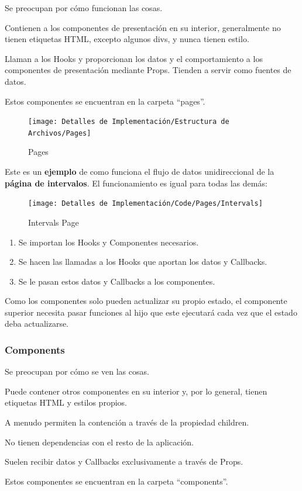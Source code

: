 \documentclass[12pt,twoside,titlepage]{report}
\begin{document}
\begin{compactitem}
    \item Se preocupan por cómo funcionan las cosas.
    \item Contienen a los componentes de presentación en su interior, generalmente no tienen etiquetas HTML, excepto algunos divs, y nunca tienen estilo.
    \item Llaman a los Hooks y proporcionan los datos y el comportamiento a los componentes de presentación mediante Props. Tienden a servir como fuentes de datos.
    \item Estos componentes se encuentran en la carpeta ``pages''.
\end{compactitem}

\begin{figure}[H]
    \centering
    \texttt{[image: Detalles de Implementación/Estructura de Archivos/Pages]}
    \label{fig:Pages}
    \caption{Pages}
\end{figure}

Este es un \textbf{ejemplo} de como funciona el flujo de datos unidireccional de la \textbf{página de intervalos}. El funcionamiento es igual para todas las demás: 

\begin{figure}[H]
    \centering
    \texttt{[image: Detalles de Implementación/Code/Pages/Intervals]}
    \label{fig:IntervalsPage}
    \caption{Intervals Page}
\end{figure}

\begin{enumerate}
    \item  Se importan los Hooks y Componentes necesarios.
    \item  Se hacen las llamadas a los Hooks que aportan los datos y Callbacks.
    \item  Se le pasan estos datos y Callbacks a los componentes.
\end{enumerate}

Como los componentes solo pueden actualizar su propio estado, el componente superior necesita pasar funciones al hijo que este ejecutará cada vez que el estado deba actualizarse.

\subsubsection{Components}

\begin{compactitem}
    \item Se preocupan por cómo se ven las cosas.
    \item Puede contener otros componentes en su interior y, por lo general, tienen etiquetas HTML y estilos propios.
    \item A menudo permiten la contención a través de la propiedad children.
    \item No tienen dependencias con el resto de la aplicación.
    \item Suelen recibir datos y Callbacks exclusivamente a través de Props.
    \item Estos componentes se encuentran en la carpeta ``components''.
\end{compactitem}
\end{document}
